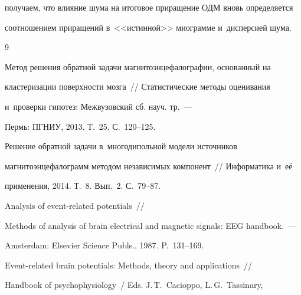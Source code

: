     получаем, что влияние шума на итоговое приращение ОДМ вновь определяется


    соотношением приращений в~<<истинной>> миограмме и~дисперсией шума.








{\small\frenchspacing


{%




\begin{thebibliography}{9}









Метод решения обратной задачи магнитоэнцефалографии, основанный на


кластеризации поверхности мозга~/\!\!/ Статистические методы оценивания


и~проверки гипотез:  Межвузовский сб. науч. тр.~---


Пермь: ПГНИУ, 2013.  Т.~25. С.~120--125.






Решение обратной задачи в~многодипольной модели источников


магнитоэнцефалограмм методом независимых компонент~/\!\!/ Информатика и~её


применения, 2014. Т.~8. Вып.~2. С.~79--87.







 Analysis of event-related potentials~/\!\!/


Methods of analysis of brain electrical and magnetic signals: EEG handbook.~---


Amsterdam: Elsevier Science Publs., 1987. P.~131--169.






Event-related brain potentials: Methods, theory and applications~/\!\!/


Handbook of psychophysiology~/ Eds. J.\,T.~Cacioppo, L.\,G.~Tassinary,



\end{thebibliography}}}
